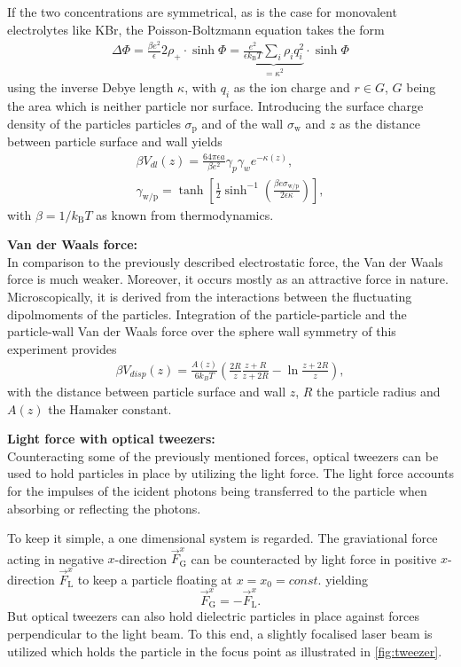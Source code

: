 \documentclass[.../bericht]{subfilies}
\begin{document}
    If the two concentrations are symmetrical, as is the case for monovalent electrolytes like KBr, the Poisson-Boltzmann equation takes the form
    \begin{align*}
    \Delta \Phi= \frac{\beta e^2}{\epsilon}2\rho_+ \cdot\sinh\Phi= \underbrace{\frac{e^2}{\epsilon k_\mathrm{B} T}\sum_i \rho_i q_i^2}_{=\kappa^2} \cdot \sinh\Phi
    \end{align*}
    using the inverse Debye length $\kappa$, with $q_i$ as the ion charge and $r\in G$, $G$ being the area which is neither particle nor surface. Introducing the surface charge density of the particles particles $\sigma_\mathrm{p}$ and of the wall $\sigma_\mathrm{w}$ and $z$ as the distance between particle surface and wall yields
    \begin{align*}
    \beta V_{dl}(z)=\frac{64\pi \epsilon a}{\beta e^2} \gamma_p \gamma_w e^{-\kappa(z)}, \\
    \gamma_\mathrm{w/p}=\tanh \left[ \frac{1}{2}\sinh^{-1}  \left( \frac{\beta e \sigma_\mathrm{w/p}}{2\epsilon \kappa } \right) \right],
    \end{align*}
    with $\beta=1/k_\mathrm{B} T$ as known from thermodynamics.
    \medskip

    \textbf{Van der Waals force:}\\
    In comparison to the previously described electrostatic force, the Van der Waals force is much weaker. Moreover, it occurs mostly as an attractive force in nature. Microscopically, it is derived from the interactions between the fluctuating dipolmoments of the particles. Integration of the particle-particle and the particle-wall Van der Waals force over the sphere wall symmetry of this experiment provides
    \begin{align}
    \beta V_{disp}(z)=\frac{A(z)}{6k_B T}\left(\frac{2R}{z}\frac{z+R}{z+2R}-\ln\frac{z+2R}{z}\right),
    \end{align}
    with the distance between particle surface and wall $z$, $R$ the particle radius and $A(z)$ the Hamaker constant.
    \medskip

    \textbf{Light force with optical tweezers:}\\
    Counteracting some of the previously mentioned forces, optical tweezers can be used to hold particles in place by utilizing the light force. The light force accounts for the impulses of the icident photons being transferred to the particle when absorbing or reflecting the photons.

    To keep it simple, a one dimensional system is regarded. The graviational force acting in negative $x$-direction $\vec{F}_\mathrm{G}^x$ can be counteracted by light force in positive $x$-direction $\vec{F}_\mathrm{L}^x$ to keep a particle floating at $x=x_0=const.$ yielding
    \begin{equation*}
    \vec{F}_\mathrm{G}^x=-\vec{F}_\mathrm{L}^x.
    \end{equation*}
    But optical tweezers can also hold dielectric particles in place against forces perpendicular to the light beam. To this end, a slightly focalised laser beam is utilized which holds the particle in the focus point as illustrated in \ref{fig:tweezer}.
\end{document}
